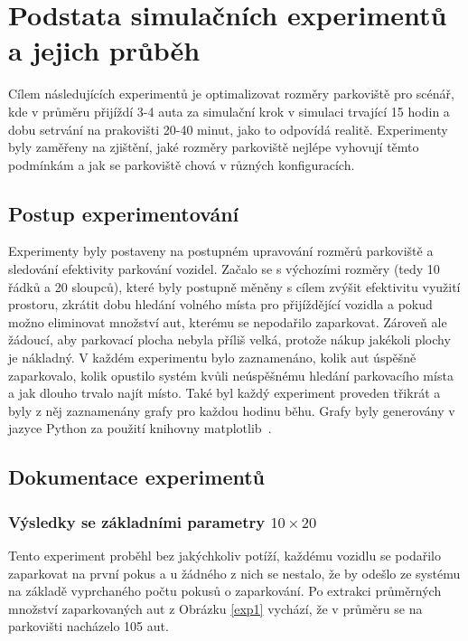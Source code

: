 \documentclass[11pt, a4paper]{article}
\begin{document}
\section{Podstata simulačních experimentů a jejich průběh}
\label{experiment_goals}

Cílem následujících experimentů je optimalizovat rozměry parkoviště pro scénář, kde v průměru přijíždí 3-4 auta za simulační krok v simulaci trvající 15 hodin a dobu setrvání na prakovišti 20-40 minut, jako to odpovídá realitě. Experimenty byly zaměřeny na zjištění, jaké rozměry parkoviště nejlépe vyhovují těmto podmínkám a jak se parkoviště chová v různých konfiguracích.

\subsection{Postup experimentování}

Experimenty byly postaveny na postupném upravování rozměrů parkoviště a sledování efektivity parkování vozidel. Začalo se s výchozími rozměry (tedy 10 řádků a 20 sloupců), které byly postupně měněny s cílem zvýšit efektivitu využití prostoru, zkrátit dobu hledání volného místa pro přijíždějící vozidla a pokud možno eliminovat množství aut, kterému se nepodařilo zaparkovat. Zároveň ale žádoucí, aby parkovací plocha nebyla příliš velká, protože nákup jakékoli plochy je nákladný. V každém experimentu bylo zaznamenáno, kolik aut úspěšně zaparkovalo, kolik opustilo systém kvůli neúspěšnému hledání parkovacího místa a jak dlouho trvalo najít místo. Také byl každý experiment proveden třikrát a byly z něj zaznamenány grafy pro každou hodinu běhu. Grafy byly generovány v jazyce Python za použití knihovny matplotlib~\cite{Kumar_2023}.

\newpage

\subsection{Dokumentace experimentů}

\subsubsection{Výsledky se základními parametry \texorpdfstring{$10 \times 20$}{10 x 20}}
\label{experiment1}

Tento experiment proběhl bez jakýchkoliv potíží, každému vozidlu se podařilo zaparkovat na první pokus a u žádného z nich se nestalo, že by odešlo ze systému na základě vyprchaného počtu pokusů o zaparkování. Po extrakci průměrných množství zaparkovaných aut z Obrázku \ref{exp1} vychází, že v průměru se na parkovišti nacházelo 105 aut.
\end{document}
